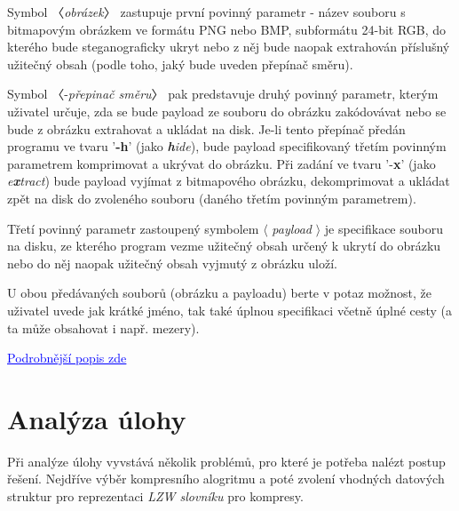 \documentclass[12pt]{report}
\begin{document}
    Symbol 〈\textit{obrázek}〉 zastupuje první povinný parametr - název souboru s bitmapovým obrázkem ve formátu PNG nebo BMP, subformátu 24-bit RGB, do kterého bude steganograficky ukryt nebo
    z něj bude naopak extrahován příslušný užitečný obsah (podle toho, jaký bude uveden přepínač směru).

    Symbol 〈-\textit{přepinač směru}〉 pak predstavuje druhý povinný parametr, kterým uživatel určuje, zda se bude payload ze souboru do obrázku zakódovávat nebo se bude z obrázku extrahovat a ukládat na disk. Je-li tento přepínač předán programu ve tvaru '\textbf{-h}' (jako\textit{ \textbf{h}ide}), bude payload specifikovaný třetím povinným parametrem komprimovat a ukrývat do obrázku. Při zadání ve tvaru '-\textbf{x}' (jako \textit{e\textbf{x}tract}) bude payload vyjímat z bitmapového obrázku, dekomprimovat a ukládat zpět na disk do zvoleného souboru (daného třetím povinným parametrem).

    Třetí povinný parametr zastoupený symbolem $\langle$ \textit{payload} $\rangle$ je specifikace souboru na disku, ze kterého program vezme užitečný obsah určený k ukrytí do obrázku nebo do něj naopak užitečný obsah vyjmutý z obrázku uloží.

    U obou předávaných souborů (obrázku a payloadu) berte v potaz možnost, že uživatel uvede jak krátké jméno, tak také úplnou specifikaci včetně úplné cesty (a ta může obsahovat i např. mezery).

    \href{https://www.kiv.zcu.cz/studies/predmety/pc/data/works/sw2023-02.pdf}{\textcolor{blue}{\underline{Podrobnější popis zde}}}



    \chapter{Analýza úlohy}
    Při analýze úlohy vyvstává několik problémů, pro které je potřeba nalézt postup řešení. Nejdříve výběr kompresního alogritmu a poté zvolení vhodných datových struktur pro reprezentaci \textit{LZW slovníku} pro kompresy.
\end{document}

